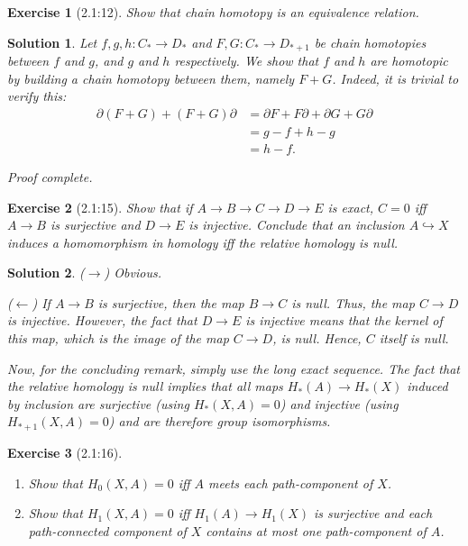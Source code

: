\documentclass{article}
\theoremstyle{plain}
\newtheorem*{ex}{Exercise}
\theoremstyle{nonumberplain}
\newtheorem{sol}{Solution}
\begin{document}
\begin{ex}[2.1:12]
Show that chain homotopy is an equivalence relation.
\end{ex}

\begin{sol}
Let $f, g, h \colon C_* \to D_*$ and $F, G \colon C_* \to D_{*+1}$ be chain homotopies between $f$ and $g$, and $g$ and $h$ respectively. We show that $f$ and $h$ are homotopic by building a chain homotopy between them, namely $F+G$. Indeed, it is trivial to verify this:
\begin{equation}
\begin{aligned}
\partial(F+G) + (F+G)\partial &= \partial F + F \partial + \partial G + G \partial \\
&= g - f + h - g \\
&= h - f.
\end{aligned}
\end{equation}

Proof complete.
\end{sol}

\begin{ex}[2.1:15]
Show that if $A \to B \to C \to D \to E$ is exact, $C = 0$ iff $A \to B$ is surjective and $D \to E$ is injective. Conclude that an inclusion $A \hookrightarrow X$ induces a homomorphism in homology iff the relative homology is null.
\end{ex}

\begin{sol}
($\rightarrow$) Obvious.

($\leftarrow$) If $A \to B$ is surjective, then the map $B \to C$ is null. Thus, the map $C \to D$ is injective. However, the fact that $D \to E$ is injective means that the kernel of this map, which is the image of the map $C \to D$, is null. Hence, $C$ itself is null.

Now, for the concluding remark, simply use the long exact sequence. The fact that the relative homology is null implies that all maps $H_*(A) \to H_*(X)$ induced by inclusion are surjective (using $H_*(X,A) = 0$) and injective (using $H_{*+1}(X,A)=0$) and are therefore group isomorphisms.
\end{sol}

\begin{ex}[2.1:16]
\leavevmode
\begin{enumerate}
\item Show that $H_0(X,A) = 0$ iff $A$ meets each path-component of $X$.
\item Show that $H_1(X,A) = 0$ iff $H_1(A) \to H_1(X)$ is surjective and each path-connected component of $X$ contains at most one path-component of $A$.
\end{enumerate}
\end{ex}
\end{document}
